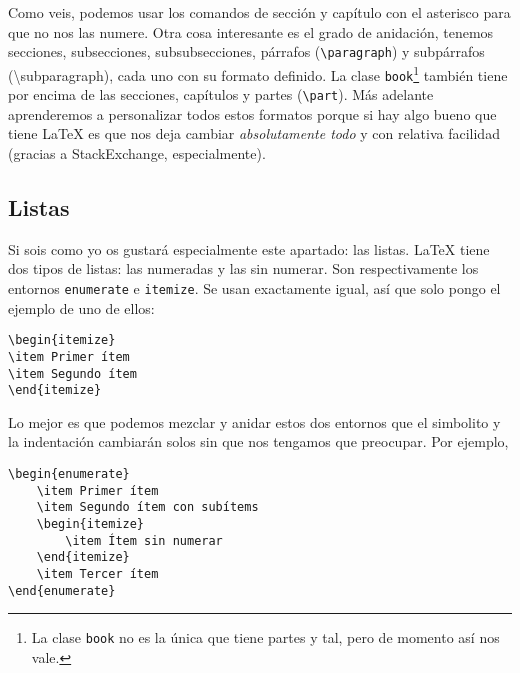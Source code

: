 Como veis, podemos usar los comandos de sección y capítulo con el
asterisco para que no nos las numere. Otra cosa interesante es el grado
de anidación, tenemos secciones, subsecciones, subsubsecciones, párrafos
(\lstinline!\paragraph!) y subpárrafos (\textbackslash{}subparagraph),
cada uno con su formato definido. La clase \lstinline!book!\footnote{La
  clase \lstinline!book! no es la única que tiene partes y tal, pero de
  momento así nos vale.} también tiene por encima de las secciones,
capítulos y partes (\lstinline!\part!). Más adelante aprenderemos a
personalizar todos estos formatos porque si hay algo bueno que tiene
LaTeX es que nos deja cambiar \emph{absolutamente todo} y con relativa
facilidad (gracias a StackExchange, especialmente).

\subsection{Listas}\label{listas}

Si sois como yo os gustará especialmente este apartado: las listas.
LaTeX tiene dos tipos de listas: las numeradas y las sin numerar. Son
respectivamente los entornos \lstinline!enumerate! e
\lstinline!itemize!. Se usan exactamente igual, así que solo pongo el
ejemplo de uno de ellos:

\begin{lstlisting}
\begin{itemize}
\item Primer ítem
\item Segundo ítem
\end{itemize}
\end{lstlisting}

Lo mejor es que podemos mezclar y anidar estos dos entornos que el
simbolito y la indentación cambiarán solos sin que nos tengamos que
preocupar. Por ejemplo,

\begin{lstlisting}
\begin{enumerate}
    \item Primer ítem
    \item Segundo ítem con subítems
    \begin{itemize}
        \item Ítem sin numerar
    \end{itemize}
    \item Tercer ítem
\end{enumerate}
\end{lstlisting}

